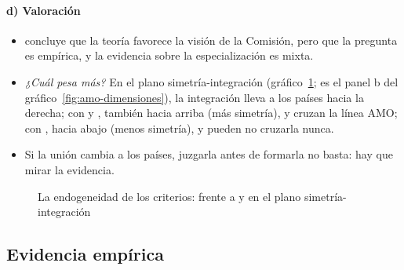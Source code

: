 \documentclass[11pt]{article}
\begin{document}
\paragraph{d) Valoración}

\begin{itemize}
\item \textcite{DeGrauwe2022Economics} concluye que la teoría favorece la visión de la Comisión, pero que la pregunta es empírica, y la evidencia sobre la especialización es mixta.
\item \emph{¿Cuál pesa más?} En el plano simetría-integración (gráfico~\ref{fig:endogeneidad}; es el panel b del gráfico~\ref{fig:amo-dimensiones}), la integración lleva a los países hacia la derecha; con  y , también hacia arriba (más simetría), y cruzan la línea AMO; con , hacia abajo (menos simetría), y pueden no cruzarla nunca.
\item Si la unión cambia a los países, juzgarla antes de formarla no basta: hay que mirar la evidencia.
\end{itemize}

\begin{figure}[H]
\centering
\caption{La endogeneidad de los criterios:  frente a  y  en el plano simetría-integración}\label{fig:endogeneidad}
\end{figure}

\subsection{Evidencia empírica}\label{sec:evidencia}
\end{document}
